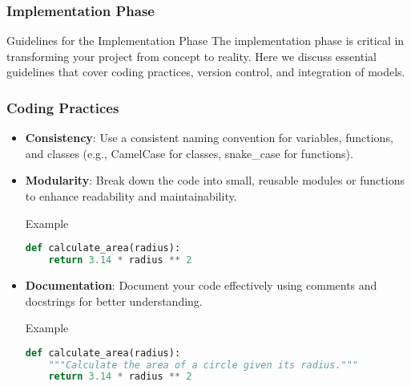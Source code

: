 \documentclass[aspectratio=169]{beamer}
\begin{document}
\begin{frame}
  \frametitle{Implementation Phase}
  \begin{block}{Guidelines for the Implementation Phase}
    The implementation phase is critical in transforming your project from concept to reality. Here we discuss essential guidelines that cover coding practices, version control, and integration of models.
  \end{block}
\end{frame}

\begin{frame}[fragile]
  \frametitle{Coding Practices}
  \begin{itemize}
    \item \textbf{Consistency}: Use a consistent naming convention for variables, functions, and classes (e.g., CamelCase for classes, snake\_case for functions).
    
    \item \textbf{Modularity}: Break down the code into small, reusable modules or functions to enhance readability and maintainability.
    \begin{block}{Example}
      \begin{lstlisting}[language=Python]
def calculate_area(radius):
    return 3.14 * radius ** 2
      \end{lstlisting}
    \end{block}

    \item \textbf{Documentation}: Document your code effectively using comments and docstrings for better understanding.
    \begin{block}{Example}
      \begin{lstlisting}[language=Python]
def calculate_area(radius):
    """Calculate the area of a circle given its radius."""
    return 3.14 * radius ** 2
      \end{lstlisting}
    \end{block}
  \end{itemize}
\end{frame}
\end{document}

